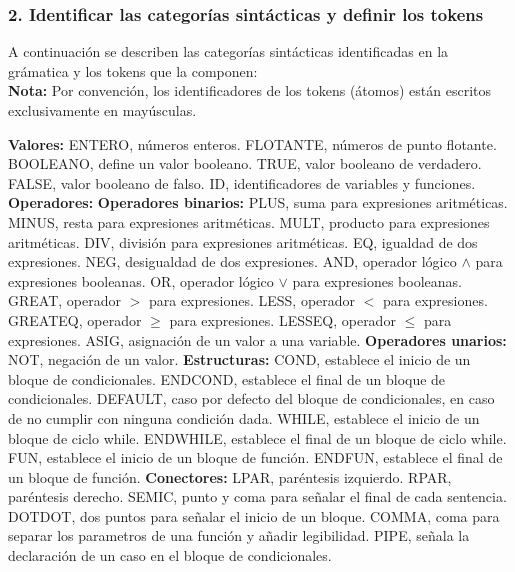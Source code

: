\documentclass[12pt]{article}
\begin{document}
\subsubsection*{2. Identificar las categorías sintácticas y definir los tokens}
A continuación se describen las categorías sintácticas identificadas en la grámatica y los tokens que la componen:\\
\textbf{Nota:} Por convención, los identificadores de los tokens (átomos) están escritos exclusivamente en mayúsculas. 
\begin{outline}
\1 \textbf{Valores:}
	\2 ENTERO, números enteros.
    \2 FLOTANTE, números de punto flotante.
    \2 BOOLEANO, define un valor booleano.
    \3 TRUE, valor booleano de verdadero.
    \3 FALSE, valor booleano de falso.
    \3 ID, identificadores de variables y funciones.
\1 \textbf{Operadores:}
	\2 \textbf{Operadores binarios:}
		\3 PLUS, suma para expresiones aritméticas.	
    	\3 MINUS, resta para expresiones aritméticas.
    	\3 MULT, producto para expresiones aritméticas.
    	\3 DIV, división para expresiones aritméticas.
    	\3 EQ, igualdad de dos expresiones.
        \3 NEG, desigualdad de dos expresiones.
    	\3 AND, operador lógico $\land$ para expresiones booleanas.
    	\3 OR, operador lógico $\lor$ para expresiones booleanas.
    	\3 GREAT, operador $>$  para expresiones.
    	\3 LESS, operador $<$ para expresiones.
    	\3 GREATEQ, operador $\geq$ para expresiones.
        \3 LESSEQ, operador $\leq$ para expresiones.
        \3 ASIG, asignación de un valor a una variable.
 	\2 \textbf{Operadores unarios:}
    	\3 NOT, negación de un valor.
 \1 \textbf{Estructuras:}
 	\2 COND, establece el inicio de un bloque de condicionales.
    \2 ENDCOND, establece el final de un bloque de condicionales.
    \2 DEFAULT, caso por defecto del bloque de condicionales, en caso de no cumplir con ninguna condición dada.
    \2 WHILE, establece el inicio de un bloque de ciclo while.
    \2 ENDWHILE, establece el final de un bloque de ciclo while.
    \2 FUN, establece el inicio de un bloque de función.
    \2 ENDFUN, establece el final de un bloque de función.
 \1 \textbf{Conectores:}
 	\2 LPAR, paréntesis izquierdo.
    \2 RPAR, paréntesis derecho.
    \2 SEMIC, punto y coma para señalar el final de cada sentencia.
    \2 DOTDOT, dos puntos para señalar el inicio de un bloque.
    \2 COMMA, coma para separar los parametros de una función y añadir legibilidad.
    \2 PIPE, señala la declaración de un caso en el bloque de condicionales.
\end{outline}
\end{document}
